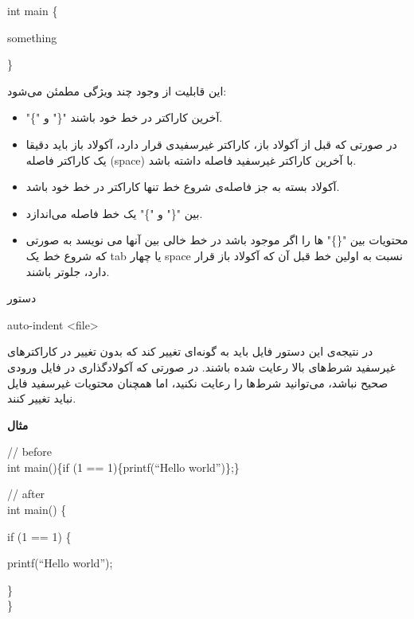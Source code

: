 \documentclass[]{article}
\begin{document}
\begin{latin}
{\mymono
int main \{

\;\;\;\;\;\;\;\;something

\} \\}
\end{latin}

این قابلیت از وجود چند ویژگی مطمئن می‌شود:

\begin{itemize}
\item
"\{" و "\}" آخرین کاراکتر در خط خود باشند.

\item
در صورتی که قبل از آکولاد باز، کاراکتر غیرسفیدی  قرار دارد، آکولاد باز باید دقیقا یک کاراکتر فاصله (space) با آخرین کاراکتر غیرسفید فاصله داشته باشد.

\item
آکولاد بسته  به جز فاصله‌ی شروع خط تنها کاراکتر در خط خود باشد.

\item
بین "\{" و "\}" یک خط فاصله می‌اندازد.

\item
محتویات بین "\{\}" ها را اگر موجود باشد در خط خالی بین آنها می نویسد به صورتی که شروع خط یک tab یا چهار space نسبت به اولین خط قبل آن که آکولاد باز قرار دارد، جلوتر باشند.
\end{itemize}

\begin{mybox}[colback=yellow]{دستور}
	\begin{latin}	
		auto-indent <file>
	\end{latin}
\end{mybox}

در نتیجه‌ی این دستور فایل باید به گونه‌ای تغییر کند که بدون تغییر در کاراکترهای غیرسفید شرط‌های بالا رعایت شده باشند. در صورتی که آکولادگذاری در فایل ورودی صحیح نباشد، می‌توانید شرط‌ها را رعایت نکنید، اما همچنان محتویات غیرسفید فایل نباید تغییر کنند.

\newpage
\textbf{مثال}

\begin{latin}
{\mymono
// before\\
int main()\;\;\;\;\;\{\;\;\;\;\;if (1 == 1)\{printf(“Hello world”)\};\;\;\;\;\;\}\\
}
\end{latin}

\begin{latin}
{\mymono
// after\\
int main() \{

\;\;\;\;if (1 == 1) \{

\;\;\;\;\;\;\;\;printf(“Hello world”);

\;\;\;\;\}\\
\}
\\
}
\end{latin}
\end{document}
